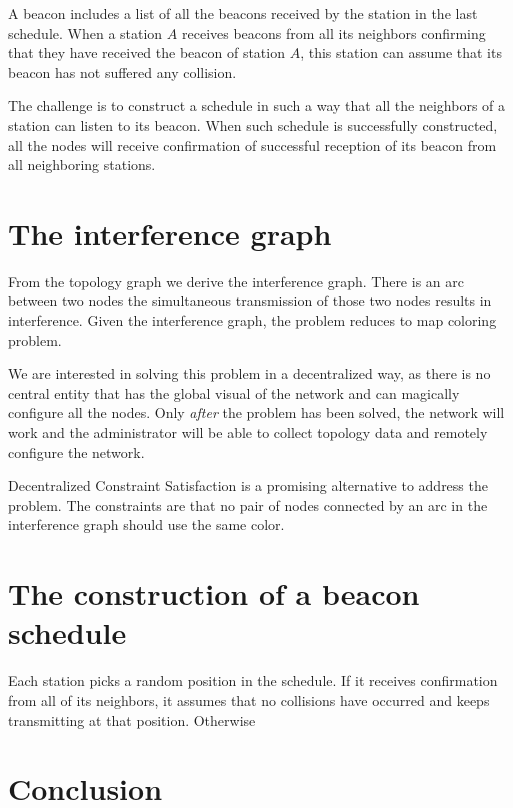 \documentclass[journal]{IEEEtran}
\begin{document}
A beacon includes a list of all the beacons received by the station in the last schedule.
When a station $A$ receives beacons from all its neighbors confirming that they have received the beacon of station $A$, this station can assume that its beacon has not suffered any collision.

The challenge is to construct a schedule in such a way that all the neighbors of a station can listen to its beacon.
When such schedule is successfully constructed, all the nodes will receive confirmation of successful reception of its beacon from all neighboring stations.

\section{The interference graph}
From the topology graph we derive the interference graph.
There is an arc between two nodes the simultaneous transmission of those two nodes results in interference.
Given the interference graph, the problem reduces to map coloring problem.

We are interested in solving this problem in a decentralized way, as there is no central entity that has the global visual of the network and can magically configure all the nodes.
Only \emph{after} the problem has been solved, the network will work and the administrator will be able to collect topology data and remotely configure the network.

Decentralized Constraint Satisfaction \cite{} is a promising alternative to address the problem.
The constraints are that no pair of nodes connected by an arc in the interference graph should use the same color.


\section{The construction of a beacon schedule}

Each station picks a random position in the schedule.
If it receives confirmation from all of its neighbors, it assumes that no collisions have occurred and keeps transmitting at that position.
Otherwise




\section{Conclusion}
\label{sec:conclusion}



\end{document}
